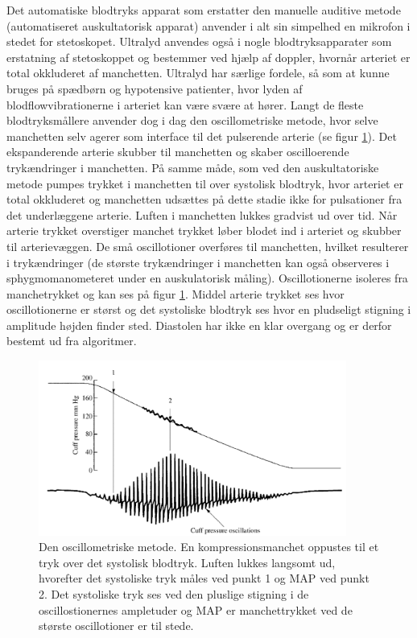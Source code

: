 Det automatiske blodtryks apparat som erstatter den manuelle auditive metode (automatiseret auskultatorisk apparat) anvender i alt sin simpelhed en mikrofon i stedet for stetoskopet. Ultralyd anvendes også i nogle blodtryksapparater som erstatning af stetoskoppet og bestemmer ved hjælp af doppler, hvornår arteriet er total okkluderet af manchetten. Ultralyd har særlige fordele, så som at kunne bruges på spædbørn og hypotensive patienter, hvor lyden af blodflowvibrationerne i arteriet kan være svære at hører. Langt de fleste blodtryksmållere anvender dog i dag den oscillometriske metode, hvor selve manchetten selv agerer som interface til det pulserende arterie (se figur \ref{fig:OscillometriskMetode}). Det ekspanderende arterie skubber til manchetten og skaber oscilloerende trykændringer i manchetten. På samme måde, som ved den auskultatoriske metode pumpes trykket i manchetten til over systolisk blodtryk, hvor arteriet er total okkluderet og manchetten udsættes på dette stadie ikke for pulsationer fra det underlæggene arterie. Luften i manchetten lukkes gradvist ud over tid. Når arterie trykket overstiger manchet trykket løber blodet ind i arteriet og skubber til arterievæggen. De små oscillotioner overføres til manchetten, hvilket resulterer i trykændringer (de største trykændringer i manchetten kan også observeres i sphygmomanometeret under en auskulatorisk måling). Oscillotionerne isoleres fra manchetrykket og kan ses på figur \ref{fig:OscillometriskMetode}. Middel arterie trykket ses hvor oscillotionerne er størst og det systoliske blodtryk ses hvor en pludseligt stigning i amplitude højden finder sted. Diastolen har ikke en klar overgang og er derfor bestemt ud fra algoritmer.

\begin{figure}[H]
	\includegraphics[width=0.9\textwidth]{billeder/OscillometriskMetode.png}
	\caption{Den oscillometriske metode. En kompressionsmanchet oppustes til et tryk over det systolisk blodtryk. Luften lukkes langsomt ud, hvorefter det systoliske tryk måles ved punkt 1 og MAP ved punkt 2. Det systoliske tryk ses ved den pluslige stigning i de oscillostionernes ampletuder og MAP er manchettrykket ved de største oscillotioner er til stede.}\label{fig:OscillometriskMetode}
\end{figure}

